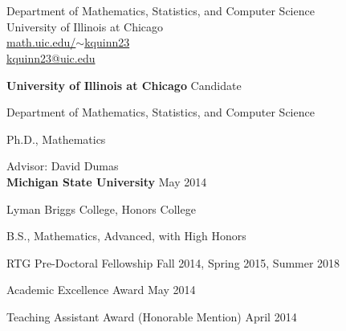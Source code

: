 \vita
\begin{singlespace}
 \hspace{-12pt}{\bf \LARGE Keaton Quinn}\\ \\
\indent Department of Mathematics, Statistics, and Computer Science \\
\indent University of Illinois at Chicago \\
\indent \href{http://www.math.uic.edu/~kquinn23}{math.uic.edu/$\sim$kquinn23}\\
\indent \href{mailto:kquinn23@uic.edu}{kquinn23@uic.edu} \\ 






\vfill

\vspace{5pt}
\hspace{-12pt}{\color{sectiontitles}{\large Education}}
\vspace{10pt}

{\bf University of Illinois at Chicago} \hfill { Candidate}

Department of Mathematics, Statistics, and Computer Science

Ph.D., Mathematics

Advisor: David Dumas
\\

{\bf Michigan State University} \hfill {May 2014} 

Lyman Briggs College, Honors College

B.S., Mathematics, Advanced, with High Honors \\

\vfill

\vspace{5pt}
\hspace{-12pt}{\color{sectiontitles}{\large Awards and Honors}}
\vspace{10pt}



	{RTG Pre-Doctoral Fellowship} \hfill{Fall 2014, Spring 2015, Summer 2018} \\
	\indent {}
	
	{Academic Excellence Award} \hfill{May 2014}\\
	\indent {}
	
	{Teaching Assistant Award (Honorable Mention)} \hfill{April 2014} \\
	\indent {}
	

\end{singlespace}
